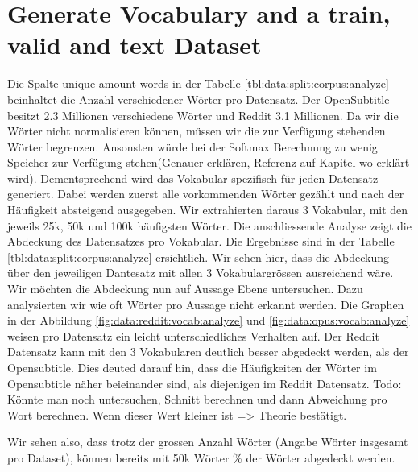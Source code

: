 \section{Generate Vocabulary and a train, valid and text Dataset}
Die Spalte unique amount words in der Tabelle \ref{tbl:data:split:corpus:analyze} beinhaltet die Anzahl verschiedener Wörter pro Datensatz. Der OpenSubtitle besitzt 2.3 Millionen verschiedene Wörter und Reddit 3.1 Millionen. Da wir die Wörter nicht normalisieren können, müssen wir die zur Verfügung stehenden Wörter begrenzen. Ansonsten würde bei der Softmax Berechnung zu wenig Speicher zur Verfügung stehen(Genauer erklären, Referenz auf Kapitel wo erklärt wird). Dementsprechend wird das Vokabular spezifisch für jeden Datensatz generiert.
Dabei werden zuerst alle vorkommenden Wörter gezählt und nach der Häufigkeit absteigend ausgegeben. Wir extrahierten daraus 3 Vokabular, mit den jeweils 25k, 50k und 100k häufigsten Wörter. Die anschliessende Analyse zeigt die Abdeckung des Datensatzes pro Vokabular. Die Ergebnisse sind in der Tabelle \ref{tbl:data:split:corpus:analyze} ersichtlich. Wir sehen hier, dass die Abdeckung über den jeweiligen Dantesatz  mit allen 3 Vokabulargrössen ausreichend wäre.
Wir möchten die Abdeckung nun auf Aussage Ebene untersuchen. Dazu analysierten wir wie oft Wörter pro Aussage nicht erkannt werden. Die Graphen in der Abbildung \ref{fig:data:reddit:vocab:analyze} und \ref{fig:data:opus:vocab:analyze} weisen pro Datensatz ein leicht unterschiedliches Verhalten auf. Der Reddit Datensatz kann mit den 3 Vokabularen deutlich besser abgedeckt werden, als der Opensubtitle. Dies deuted darauf hin, dass die Häufigkeiten der Wörter im Opensubtitle näher beieinander sind, als diejenigen im Reddit Datensatz.
Todo: Könnte man noch untersuchen, Schnitt berechnen und dann Abweichung pro Wort berechnen. Wenn dieser Wert kleiner ist  => Theorie bestätigt.

Wir sehen also, dass trotz der grossen Anzahl Wörter (Angabe Wörter insgesamt pro Dataset), können bereits mit 50k Wörter \% der Wörter abgedeckt werden.


